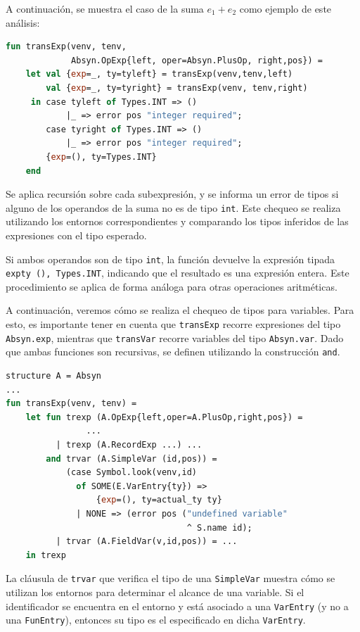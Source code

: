\documentclass[runningheads]{llncs}
\begin{document}
A continuación, se muestra el caso de la suma $e_1 + e_2$ como ejemplo de este análisis:


\begin{lstlisting}[language=ML, caption={Implementación parcial de la función transExp para la operación suma}, captionpos=b]
fun transExp(venv, tenv, 
             Absyn.OpExp{left, oper=Absyn.PlusOp, right,pos}) =
    let val {exp=_, ty=tyleft} = transExp(venv,tenv,left)
        val {exp=_, ty=tyright} = transExp(venv, tenv,right)
     in case tyleft of Types.INT => ()
            |_ => error pos "integer required";
        case tyright of Types.INT => ()
            |_ => error pos "integer required";
        {exp=(), ty=Types.INT}
    end
\end{lstlisting}

Se aplica recursión sobre cada subexpresión, y se informa un error de tipos si alguno de los operandos de la suma no es de tipo \texttt{int}. Este chequeo se realiza utilizando los entornos correspondientes y comparando los tipos inferidos de las expresiones con el tipo esperado.

Si ambos operandos son de tipo \texttt{int}, la función devuelve la expresión tipada \texttt{expty {(), Types.INT}}, indicando que el resultado es una expresión entera. Este procedimiento se aplica de forma análoga para otras operaciones aritméticas.

A continuación, veremos cómo se realiza el chequeo de tipos para variables. Para esto, es importante tener en cuenta que \texttt{transExp} recorre expresiones del tipo \texttt{Absyn.exp}, mientras que \texttt{transVar} recorre variables del tipo \texttt{Absyn.var}. Dado que ambas funciones son recursivas, se definen utilizando la construcción \texttt{and}.

\begin{lstlisting}[language=ML, caption={Versión limpia y parcial de la función transExp}, captionpos=b]
structure A = Absyn
...
fun transExp(venv, tenv) = 
    let fun trexp (A.OpExp{left,oper=A.PlusOp,right,pos}) =
                ...
          | trexp (A.RecordExp ...) ...
        and trvar (A.SimpleVar (id,pos)) =
            (case Symbol.look(venv,id)
              of SOME(E.VarEntry{ty}) =>
                  {exp=(), ty=actual_ty ty}
              | NONE => (error pos ("undefined variable"
                                    ^ S.name id);
          | trvar (A.FieldVar(v,id,pos)) = ...
    in trexp
\end{lstlisting}

La cláusula de \texttt{trvar} que verifica el tipo de una \texttt{SimpleVar} muestra cómo se utilizan los entornos para determinar el alcance de una variable. Si el identificador se encuentra en el entorno y está asociado a una \texttt{VarEntry} (y no a una \texttt{FunEntry}), entonces su tipo es el especificado en dicha \texttt{VarEntry}.
\end{document}
